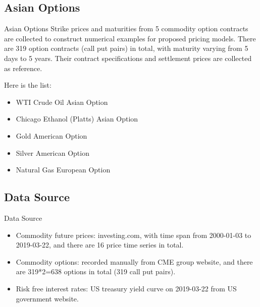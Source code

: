 \documentclass[8pt]{beamer}
\numberwithin{equation}{section}
\begin{document}
\subsection{Asian Options}
\begin{frame}{Asian Options}
Strike prices and maturities from 5 commodity option contracts are collected to construct numerical examples for proposed pricing models. There are 319 option contracts (call put pairs) in total, with maturity varying from 5 days to 5 years. Their contract specifications and settlement prices are collected as reference. 

Here is the list:

\begin{itemize}
	\item WTI Crude Oil Asian Option
	\item Chicago Ethanol (Platts) Asian Option
	\item Gold American Option
	\item Silver American Option
	\item Natural Gas European Option
\end{itemize}
\end{frame}

\subsection{Data Source}
\begin{frame}{Data Source}
\begin{itemize}
	\item Commodity future prices: investing.com, with time span from 2000-01-03 to 2019-03-22, and there are 16 price time series in total.
	\item Commodity options: recorded manually from CME group website, and there are 319*2=638 options in total (319 call put pairs).
	\item Risk free interest rates: US treasury yield curve on 2019-03-22 from US government website.
\end{itemize}
\end{frame}
\end{document}
